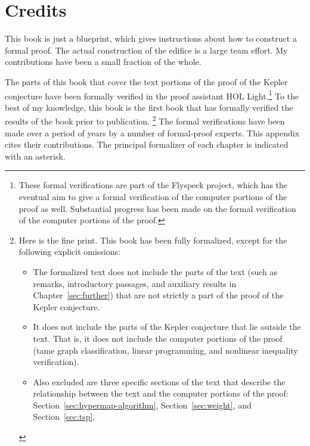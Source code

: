 
\chapter{Credits}\label{sec:credit}

This book is just a blueprint, which gives instructions about how to
construct a formal proof.  The actual construction of the edifice is a
large team effort.  My contributions have been a small fraction of the
whole.

The parts of this book that cover the text portions of the proof of
the Kepler conjecture have been formally verified in the proof
assistant HOL Light.\footnote{These formal verifications are part of
  the Flyspeck project, which has the eventual aim to give a formal
  verification of the computer portions of the proof as
  well. Substantial progress has been made on the formal verification
  of the computer portions of the proof.} 
To the best of my knowledge, this book is the first book
that has formally verified the results of the book
prior to publication.  %
\footnote{ Here is the fine print.  This book has been fully
  formalized, except for the following explicit omissions:
\begin{itemize}
\item The formalized text does not include the parts of the text (such
  as remarks, introductory passages, and auxiliary results in 
  Chapter~\ref{sec:further}) that are
  not strictly a part of the proof of the Kepler conjecture.
\item It does not include the parts of the Kepler conjecture that lie
  outside the text. That is, it does not include the computer portions
  of the proof (tame graph classification, linear programming, and
  nonlinear inequality verification).
\item Also excluded are three specific sections of the text that describe
  the relationship between the text and the computer portions of
  the proof: Section~\ref{sec:hypermap-algorithm}, Section~\ref{sec:weight}, and Section~\ref{sec:tsp},
\end{itemize}
}
 The formal verifications
have been made over a period of years by a number of formal-proof
experts.  This appendix cites their contributions. The principal
formalizer of each chapter is indicated with an asterisk.

